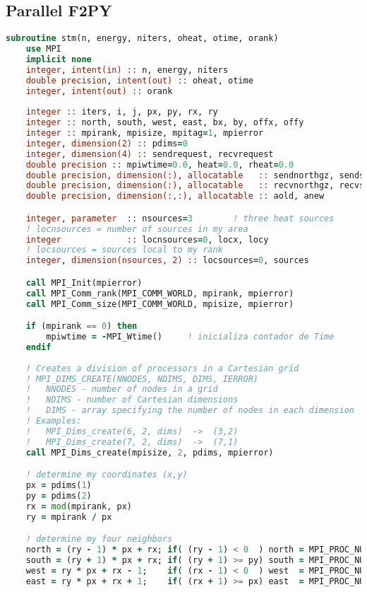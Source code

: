 \subsection{Parallel F2PY}
\begin{lstlisting}[language=Fortran, caption={Parallel F2PY implementation of the stencil test case - F90 module code.}]
subroutine stm(n, energy, niters, oheat, otime, orank)
    use MPI
    implicit none
    integer, intent(in) :: n, energy, niters
    double precision, intent(out) :: oheat, otime
    integer, intent(out) :: orank
    
    integer :: iters, i, j, px, py, rx, ry
    integer :: north, south, west, east, bx, by, offx, offy
    integer :: mpirank, mpisize, mpitag=1, mpierror
    integer, dimension(2) :: pdims=0
    integer, dimension(4) :: sendrequest, recvrequest
    double precision :: mpiwtime=0.0, heat=0.0, rheat=0.0
    double precision, dimension(:), allocatable   :: sendnorthgz, sendsouthgz
    double precision, dimension(:), allocatable   :: recvnorthgz, recvsouthgz
    double precision, dimension(:,:), allocatable :: aold, anew

    integer, parameter  :: nsources=3        ! three heat sources
    ! locnsources = number of sources in my area
    integer             :: locnsources=0, locx, locy
    ! locsources = sources local to my rank
    integer, dimension(nsources, 2) :: locsources=0, sources

    call MPI_Init(mpierror)
    call MPI_Comm_rank(MPI_COMM_WORLD, mpirank, mpierror)
    call MPI_Comm_size(MPI_COMM_WORLD, mpisize, mpierror)

    if (mpirank == 0) then
        mpiwtime = -MPI_Wtime()     ! inicializa contador de Time
    endif
    
    ! Creates a division of processors in a Cartesian grid
    ! MPI_DIMS_CREATE(NNODES, NDIMS, DIMS, IERROR)
    !   NNODES - number of nodes in a grid
    !   NDIMS - number of Cartesian dimensions 
    !   DIMS - array specifying the number of nodes in each dimension
    ! Examples:
    !   MPI_Dims_create(6, 2, dims)  ->  (3,2)
    !   MPI_Dims_create(7, 2, dims)  ->  (7,1)
    call MPI_Dims_create(mpisize, 2, pdims, mpierror)

    ! determine my coordinates (x,y)
    px = pdims(1)
    py = pdims(2)
    rx = mod(mpirank, px)
    ry = mpirank / px

    ! determine my four neighbors
    north = (ry - 1) * px + rx; if( (ry - 1) < 0  ) north = MPI_PROC_NULL
    south = (ry + 1) * px + rx; if( (ry + 1) >= py) south = MPI_PROC_NULL
    west = ry * px + rx - 1;    if( (rx - 1) < 0  ) west  = MPI_PROC_NULL
    east = ry * px + rx + 1;    if( (rx + 1) >= px) east  = MPI_PROC_NULL


\end{lstlisting}
